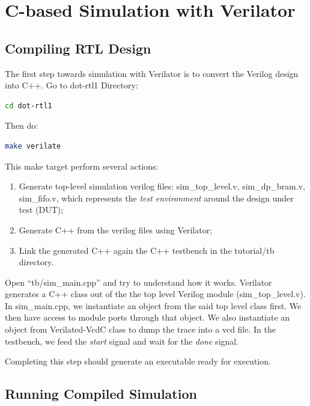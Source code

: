 \documentclass[12pt]{article}
\begin{document}
\section{C-based Simulation with Verilator}

\subsection{Compiling RTL Design}

The first step towards simulation with Verilator is to convert the
Verilog design into C++. Go to dot-rtl1 Directory:

\begin{lstlisting}[language=bash]
cd dot-rtl1
\end{lstlisting}

Then do:

\begin{lstlisting}[language=bash]
make verilate
\end{lstlisting}

This make target perform several actions:

\begin{enumerate}
\item Generate top-level simulation verilog files:
  sim\_top\_level.v, sim\_dp\_bram.v, sim\_fifo.v, which
  represents the {\em test environment} around the design
  under test (DUT);

\item Generate C++ from the verilog files using Verilator;

\item Link the generated C++ again the C++ testbench in
  the tutorial/tb directory. 
  
\end{enumerate}

Open “tb/sim\_main.cpp” and try to understand how it works.  Verilator
generates a C++ class out of the the top level Verilog module
(sim\_top\_level.v).  In sim\_main.cpp, we instantiate an object from
the said top level class first. We then have access to module ports
through that object. We also instantiate an object from Verilated-VcdC
class to dump the trace into a vcd file. In the testbench, we feed the
{\em start} signal and wait for the {\em done} signal.

Completing this step should generate an executable ready for execution.

\subsection{Running Compiled Simulation}
\end{document}
